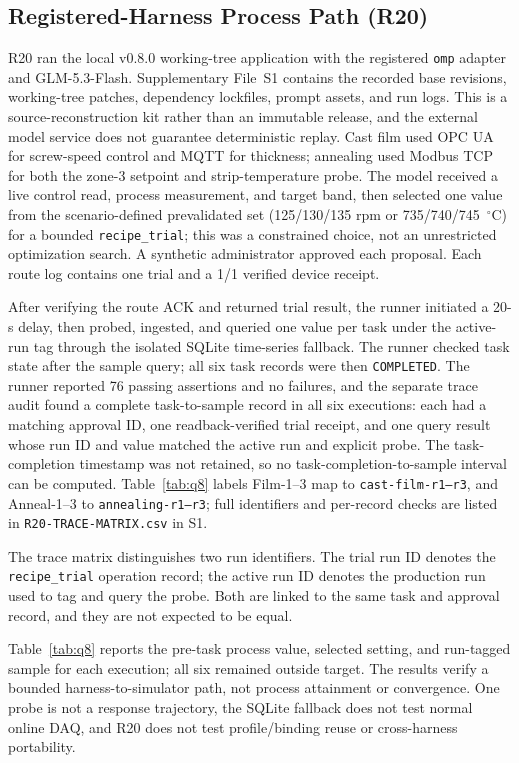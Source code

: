 \subsection{Registered-Harness Process Path (R20)}
\label{sec:harness-e2e}
R20 ran the local v0.8.0 working-tree application with the registered
\texttt{omp} adapter and GLM-5.3-Flash. Supplementary File~S1 contains the
recorded base revisions, working-tree patches, dependency lockfiles, prompt
assets, and run logs. This is a source-reconstruction kit rather than an
immutable release, and the external model service does not guarantee
deterministic replay. Cast film used OPC UA for screw-speed
control and MQTT for thickness; annealing used Modbus TCP for both the zone-3
setpoint and strip-temperature probe. The model received a live control read,
process measurement, and target band, then selected one value from the
scenario-defined prevalidated set (125/130/135 rpm or 735/740/745~$^{\circ}$C)
for a bounded \texttt{recipe\_trial}; this was a constrained choice, not an
unrestricted optimization search. A synthetic administrator approved each
proposal. Each route log contains one trial and a 1/1 verified device receipt.

After verifying the route ACK and returned trial result, the runner initiated
a 20-s delay, then probed, ingested, and queried one value per task under the
active-run tag through the isolated SQLite time-series fallback. The runner
checked task state after the sample query; all six task records were then
\texttt{COMPLETED}. The runner reported 76 passing assertions and no failures, and
the separate trace audit found a complete task-to-sample record in all six
executions: each had a matching approval ID, one readback-verified trial
receipt, and one query result whose run ID and value matched the active run and
explicit probe. The task-completion timestamp was not retained, so no
task-completion-to-sample interval can be computed. Table~\ref{tab:q8} labels
Film-1--3 map to \texttt{cast-film-r1--r3}, and Anneal-1--3 to
\texttt{annealing-r1--r3}; full identifiers and per-record checks are listed
in \texttt{R20-TRACE-MATRIX.csv} in S1.

The trace matrix distinguishes two run identifiers. The trial run ID denotes
the \texttt{recipe\_trial} operation record; the active run ID denotes the
production run used to tag and query the probe. Both are linked to the same
task and approval record, and they are not expected to be equal.

Table~\ref{tab:q8} reports the pre-task process value, selected setting, and
run-tagged sample for each execution; all six remained outside target. The
results verify a bounded harness-to-simulator path, not process attainment or
convergence. One probe is not a response trajectory, the SQLite fallback does
not test normal online DAQ, and R20 does not test profile/binding reuse or
cross-harness portability.

